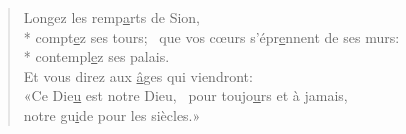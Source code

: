 \begin{verse}
Longez les remp\underline{a}rts de Sion, \\*
compt\underline{e}z ses tours;~\psalmstar
{}que vos cœurs s’épr\underline{e}nnent de ses murs: \\*
contempl\underline{e}z ses palais. \\

Et vous direz aux \underline{â}ges qui viendront: \\
«Ce Die\underline{u} est notre Dieu,~\psalmstar
pour toujo\underline{u}rs et à jamais, \\
notre gu\underline{i}de pour les siècles.» \\
\end{verse}

